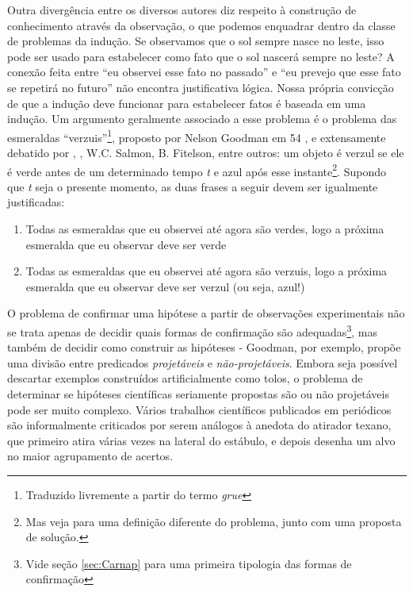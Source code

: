 Outra divergência entre os diversos autores diz respeito à construção de conhecimento através da observação,
o que podemos enquadrar dentro da classe de problemas da indução.
Se observamos que o sol sempre nasce no leste,
isso pode ser usado para estabelecer como fato que o sol nascerá sempre no leste? A conexão feita entre ``eu observei esse
fato no passado'' e ``eu prevejo que esse fato se repetirá no futuro'' não encontra justificativa lógica. Nossa própria convicção
de que a indução deve funcionar para estabelecer fatos é baseada em uma indução. 
Um argumento geralmente associado a esse problema é o problema das esmeraldas ``verzuis''\footnote{Traduzido 
livremente a partir do termo {\em grue}}, proposto por Nelson Goodman em 54 \citep{Goodman83}, 
e extensamente debatido por 
\cite{Hacking65}, \cite{Kyburg74}, W.C. Salmon, B. Fitelson, entre outros: um objeto é verzul se ele
é verde antes de um determinado tempo {\em t} e azul após esse instante\footnote{Mas veja \citep{Quine70}
para uma definição diferente do problema, junto com uma proposta de solução.}. Supondo que {\em t} seja
o presente momento, as duas frases a seguir devem ser igualmente justificadas:
\begin{enumerate}
	\item Todas as esmeraldas que eu observei até agora são verdes, logo a próxima esmeralda que eu observar
		deve ser verde
	\item Todas as esmeraldas que eu observei até agora são verzuis, logo a próxima esmeralda que eu observar
		deve ser verzul (ou seja, azul!)
\end{enumerate}

O problema de confirmar uma hipótese a partir de observações experimentais não se trata apenas de decidir
quais formas de confirmação são adequadas\footnote{Vide seção \ref{sec:Carnap} para uma primeira tipologia
das formas de confirmação}, mas também de decidir como construir as hipóteses - Goodman, por exemplo, 
propõe uma divisão entre predicados {\em projetáveis} e {\em não-projetáveis}. Embora seja possível descartar
exemplos construídos artificialmente como tolos, o problema de determinar se hipóteses científicas seriamente 
propostas são ou não projetáveis pode ser muito complexo. Vários trabalhos científicos publicados em 
periódicos são informalmente criticados por serem análogos à anedota do atirador texano, que primeiro atira
várias vezes na lateral do estábulo, e depois desenha um alvo no maior agrupamento de acertos.

